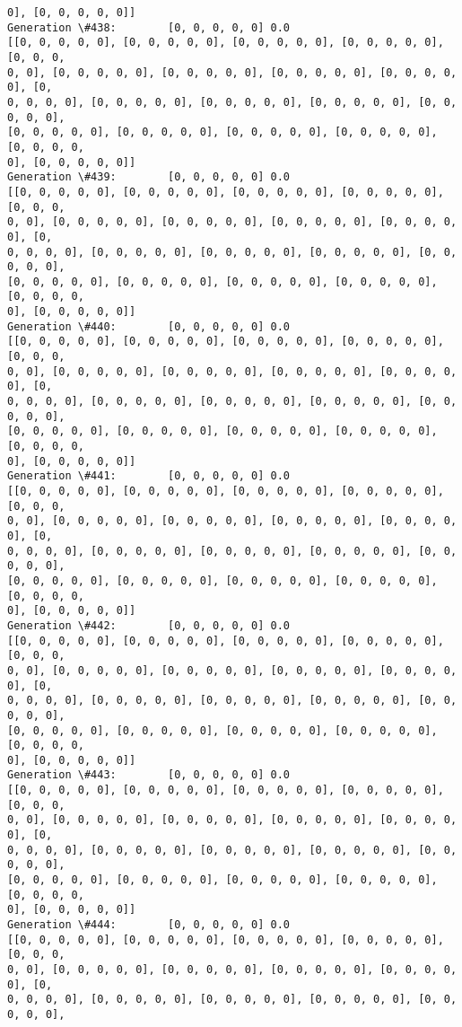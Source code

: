 \documentclass[11pt]{article}
\begin{document}
\begin{Verbatim}[commandchars=\\\{\}]
0], [0, 0, 0, 0, 0]]
Generation \#438:        [0, 0, 0, 0, 0] 0.0
[[0, 0, 0, 0, 0], [0, 0, 0, 0, 0], [0, 0, 0, 0, 0], [0, 0, 0, 0, 0], [0, 0, 0,
0, 0], [0, 0, 0, 0, 0], [0, 0, 0, 0, 0], [0, 0, 0, 0, 0], [0, 0, 0, 0, 0], [0,
0, 0, 0, 0], [0, 0, 0, 0, 0], [0, 0, 0, 0, 0], [0, 0, 0, 0, 0], [0, 0, 0, 0, 0],
[0, 0, 0, 0, 0], [0, 0, 0, 0, 0], [0, 0, 0, 0, 0], [0, 0, 0, 0, 0], [0, 0, 0, 0,
0], [0, 0, 0, 0, 0]]
Generation \#439:        [0, 0, 0, 0, 0] 0.0
[[0, 0, 0, 0, 0], [0, 0, 0, 0, 0], [0, 0, 0, 0, 0], [0, 0, 0, 0, 0], [0, 0, 0,
0, 0], [0, 0, 0, 0, 0], [0, 0, 0, 0, 0], [0, 0, 0, 0, 0], [0, 0, 0, 0, 0], [0,
0, 0, 0, 0], [0, 0, 0, 0, 0], [0, 0, 0, 0, 0], [0, 0, 0, 0, 0], [0, 0, 0, 0, 0],
[0, 0, 0, 0, 0], [0, 0, 0, 0, 0], [0, 0, 0, 0, 0], [0, 0, 0, 0, 0], [0, 0, 0, 0,
0], [0, 0, 0, 0, 0]]
Generation \#440:        [0, 0, 0, 0, 0] 0.0
[[0, 0, 0, 0, 0], [0, 0, 0, 0, 0], [0, 0, 0, 0, 0], [0, 0, 0, 0, 0], [0, 0, 0,
0, 0], [0, 0, 0, 0, 0], [0, 0, 0, 0, 0], [0, 0, 0, 0, 0], [0, 0, 0, 0, 0], [0,
0, 0, 0, 0], [0, 0, 0, 0, 0], [0, 0, 0, 0, 0], [0, 0, 0, 0, 0], [0, 0, 0, 0, 0],
[0, 0, 0, 0, 0], [0, 0, 0, 0, 0], [0, 0, 0, 0, 0], [0, 0, 0, 0, 0], [0, 0, 0, 0,
0], [0, 0, 0, 0, 0]]
Generation \#441:        [0, 0, 0, 0, 0] 0.0
[[0, 0, 0, 0, 0], [0, 0, 0, 0, 0], [0, 0, 0, 0, 0], [0, 0, 0, 0, 0], [0, 0, 0,
0, 0], [0, 0, 0, 0, 0], [0, 0, 0, 0, 0], [0, 0, 0, 0, 0], [0, 0, 0, 0, 0], [0,
0, 0, 0, 0], [0, 0, 0, 0, 0], [0, 0, 0, 0, 0], [0, 0, 0, 0, 0], [0, 0, 0, 0, 0],
[0, 0, 0, 0, 0], [0, 0, 0, 0, 0], [0, 0, 0, 0, 0], [0, 0, 0, 0, 0], [0, 0, 0, 0,
0], [0, 0, 0, 0, 0]]
Generation \#442:        [0, 0, 0, 0, 0] 0.0
[[0, 0, 0, 0, 0], [0, 0, 0, 0, 0], [0, 0, 0, 0, 0], [0, 0, 0, 0, 0], [0, 0, 0,
0, 0], [0, 0, 0, 0, 0], [0, 0, 0, 0, 0], [0, 0, 0, 0, 0], [0, 0, 0, 0, 0], [0,
0, 0, 0, 0], [0, 0, 0, 0, 0], [0, 0, 0, 0, 0], [0, 0, 0, 0, 0], [0, 0, 0, 0, 0],
[0, 0, 0, 0, 0], [0, 0, 0, 0, 0], [0, 0, 0, 0, 0], [0, 0, 0, 0, 0], [0, 0, 0, 0,
0], [0, 0, 0, 0, 0]]
Generation \#443:        [0, 0, 0, 0, 0] 0.0
[[0, 0, 0, 0, 0], [0, 0, 0, 0, 0], [0, 0, 0, 0, 0], [0, 0, 0, 0, 0], [0, 0, 0,
0, 0], [0, 0, 0, 0, 0], [0, 0, 0, 0, 0], [0, 0, 0, 0, 0], [0, 0, 0, 0, 0], [0,
0, 0, 0, 0], [0, 0, 0, 0, 0], [0, 0, 0, 0, 0], [0, 0, 0, 0, 0], [0, 0, 0, 0, 0],
[0, 0, 0, 0, 0], [0, 0, 0, 0, 0], [0, 0, 0, 0, 0], [0, 0, 0, 0, 0], [0, 0, 0, 0,
0], [0, 0, 0, 0, 0]]
Generation \#444:        [0, 0, 0, 0, 0] 0.0
[[0, 0, 0, 0, 0], [0, 0, 0, 0, 0], [0, 0, 0, 0, 0], [0, 0, 0, 0, 0], [0, 0, 0,
0, 0], [0, 0, 0, 0, 0], [0, 0, 0, 0, 0], [0, 0, 0, 0, 0], [0, 0, 0, 0, 0], [0,
0, 0, 0, 0], [0, 0, 0, 0, 0], [0, 0, 0, 0, 0], [0, 0, 0, 0, 0], [0, 0, 0, 0, 0],

\end{Verbatim}
\end{document}
